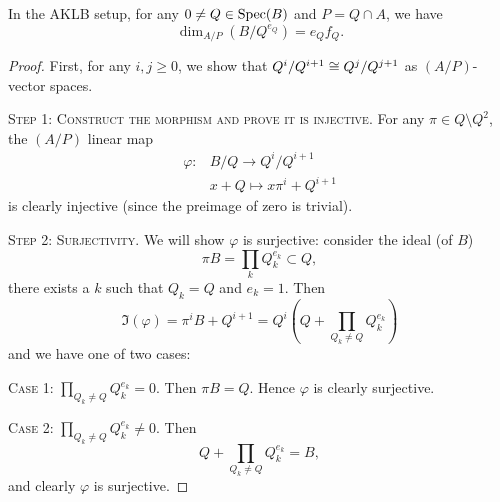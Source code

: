 
\lecture{}

\begin{lemma}\label{lemma:19.4}
In the AKLB setup, for any $0\neq Q\in\operatorname{Spec}(B)$ and $P=Q\cap A$, we
have
\begin{equation*}
\dim_{A/P}(B/Q^{e_{Q}})=e_{Q}f_{Q}.
\end{equation*}
\end{lemma}

\begin{proof}
First, for any $i,j\geq0$, we show that $Q^{i}/Q^{i+1}\cong Q^{j}/Q^{j+1}$
as $(A/P)$-vector spaces.

\textsc{Step 1: Construct the morphism and prove it is injective}. For any $\pi\in Q\setminus Q^{2}$, the $(A/P)$ linear map
\begin{equation}
\begin{split}
\varphi\colon&B/Q\to Q^{i}/Q^{i+1}\\
&x+Q\mapsto x\pi^{i}+Q^{i+1}
\end{split}
\end{equation}
is clearly injective (since the preimage of zero is trivial).

\textsc{Step 2: Surjectivity}.
We will show $\varphi$ is surjective: consider the ideal (of $B$)
\begin{equation}
\pi B=\prod_{k}Q_{k}^{e_{k}}\subset Q,
\end{equation}
there exists a $k$ such that $Q_{k}=Q$ and $e_{k}=1$. Then
\begin{equation}
\Im(\varphi)=\pi^{i}B+Q^{i+1}
=Q^{i}(Q+\prod_{Q_{k}\neq Q}Q_{k}^{e_{k}})
\end{equation}
and we have one of two cases:

\textsc{Case 1:} $\prod_{Q_{k}\neq Q}Q_{k}^{e_{k}}=0$. Then $\pi B=Q$.
Hence $\varphi$ is clearly surjective.

\textsc{Case 2:} $\prod_{Q_{k}\neq Q}Q_{k}^{e_{k}}\neq0$.
Then
\begin{equation}
Q+\prod_{Q_{k}\neq Q}Q_{k}^{e_{k}}=B,
\end{equation}
and clearly $\varphi$ is surjective.


\end{proof}
